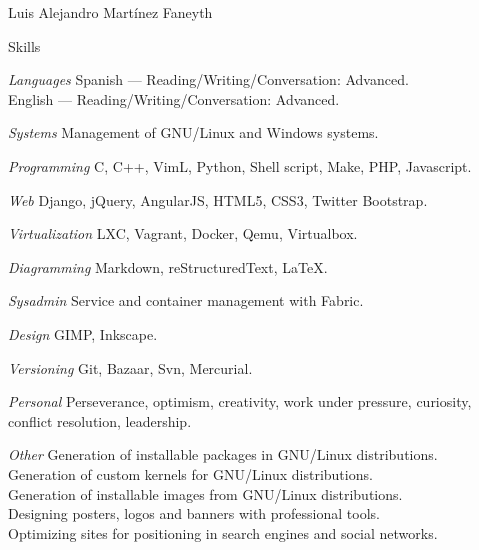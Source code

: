 \documentclass[11pt,letterpaper]{article}
\begin{document}
\begin{cv}{Luis Alejandro Mart\'inez Faneyth}
\begin{cvlist}{Skills}
\item[\textit{\large{Languages}}]{
	Spanish --- Reading/Writing/Conversation: Advanced.\\
	English --- Reading/Writing/Conversation: Advanced.
}
\item[\textit{\large{Systems}}]{Management of GNU/Linux and Windows systems.}
\item[\textit{\large{Programming}}]{C, C++, VimL, Python, Shell script, Make, PHP, Javascript.}
\item[\textit{\large{Web}}]{Django, jQuery, AngularJS, HTML5, CSS3, Twitter Bootstrap.}
\item[\textit{\large{Virtualization}}]{LXC, Vagrant, Docker, Qemu, Virtualbox.}
\item[\textit{\large{Diagramming}}]{Markdown, reStructuredText, \LaTeX.}
\item[\textit{\large{Sysadmin}}]{Service and container management with Fabric.}
\item[\textit{\large{Design}}]{GIMP, Inkscape.}
\item[\textit{\large{Versioning}}]{Git, Bazaar, Svn, Mercurial.}
\item[\textit{\large{Personal}}]{Perseverance, optimism, creativity, work under pressure, curiosity, conflict resolution, leadership.}
\item[\textit{\large{Other}}]{
	Generation of installable packages in GNU/Linux distributions.\\
	Generation of custom kernels for GNU/Linux distributions.\\
	Generation of installable images from GNU/Linux distributions.\\
	Designing posters, logos and banners with professional tools.\\
	Optimizing sites for positioning in search engines and social networks.
}
\end{cvlist}

\end{cv}
\end{document}
